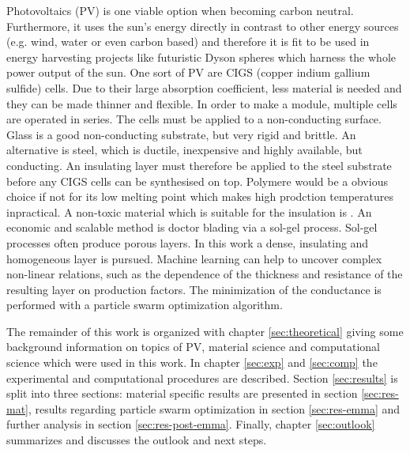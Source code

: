 Photovoltaics (PV) is one viable option when becoming carbon neutral. 
Furthermore, 
it uses the sun's energy directly in contrast to other energy sources (e.g. wind, water or even carbon based) and therefore 
it is fit to be used in energy harvesting projects like futuristic Dyson spheres\cite{dyson1960search} which harness the whole power output of the sun.
%
One sort of PV are CIGS (copper indium gallium sulfide) cells\cite{Vasekar2010}. 
Due to their large absorption coefficient, less material is needed and they can be made thinner and flexible. 
In order to make a module, multiple cells are operated in series. 
The cells must be applied to a non-conducting surface.
Glass is a good non-conducting substrate, but very rigid and brittle. 
An alternative is steel, which is ductile, inexpensive and highly available, but conducting. 
An insulating layer must therefore be applied to the steel substrate before any CIGS cells can be synthesised on top.
Polymere would be a obvious choice if not for its low melting point which makes high prodction temperatures inpractical.
A non-toxic material which is suitable for the insulation is . 
An economic and scalable method is doctor blading via a sol-gel process. 
Sol-gel processes often produce porous layers. 
In this work a dense, insulating and homogeneous layer is pursued. 
Machine learning can help to uncover complex non-linear relations, such as the 
dependence of the thickness and resistance of the resulting layer on production factors.
The minimization of the conductance is performed with a particle swarm optimization 
algorithm. 


The remainder of this work is organized with chapter 
\ref{sec:theoretical} giving 
some background information on topics of PV, material science and computational science which were used in this work.
In chapter \ref{sec:exp} and \ref{sec:comp} the experimental and computational procedures are described. 
Section \ref{sec:results} is split into three sections: material specific results are presented in section \ref{sec:res-mat}, results regarding particle swarm optimization in section \ref{sec:res-emma} and further analysis in section \ref{sec:res-post-emma}.
Finally, chapter \ref{sec:outlook} summarizes and discusses the outlook and next steps.

